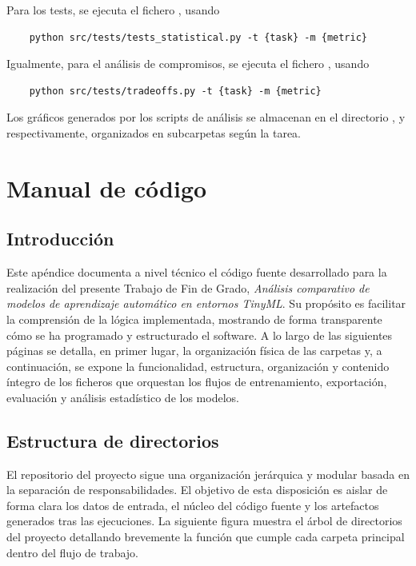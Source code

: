 \documentclass[a4paper,12pt,twoside,final]{book}
\begin{document}
Para los tests, se ejecuta el fichero , usando
\begin{verbatim}
    python src/tests/tests_statistical.py -t {task} -m {metric}
\end{verbatim}

Igualmente, para el análisis de compromisos, se ejecuta el fichero , usando
\begin{verbatim}
    python src/tests/tradeoffs.py -t {task} -m {metric}
\end{verbatim}

Los gráficos generados por los scripts de análisis se almacenan en el directorio , y
 respectivamente, organizados en subcarpetas según la tarea.

\chapter{Manual de código}
\label{anexo:manual_codigo}

\section{Introducción}
Este apéndice documenta a nivel técnico el código fuente desarrollado para la realización del presente Trabajo de Fin
de Grado, \textit{Análisis comparativo de modelos de aprendizaje automático en entornos TinyML}. Su propósito es
facilitar la comprensión de la lógica implementada, mostrando de forma transparente cómo se ha programado y estructurado
el software. A lo largo de las siguientes páginas se detalla, en primer lugar, la organización física de las carpetas y,
a continuación, se expone la funcionalidad, estructura, organización y contenido íntegro de los ficheros que orquestan
los flujos de entrenamiento, exportación, evaluación y análisis estadístico de los modelos.

\section{Estructura de directorios}
El repositorio del proyecto sigue una organización jerárquica y modular basada en la separación de responsabilidades. El
objetivo de esta disposición es aislar de forma clara los datos de entrada, el núcleo del código fuente y los artefactos
generados tras las ejecuciones. La siguiente figura muestra el árbol de directorios del proyecto detallando brevemente
la función que cumple cada carpeta principal dentro del flujo de trabajo.
\end{document}
